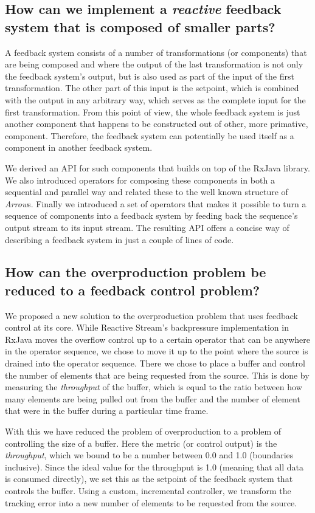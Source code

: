 \subsection*{How can we implement a \textit{reactive} feedback system that is composed of smaller parts?}
A feedback system consists of a number of transformations (or components) that are being composed and where the output of the last transformation is not only the feedback system's output, but is also used as part of the input of the first transformation. The other part of this input is the setpoint, which is combined with the output in any arbitrary way, which serves as the complete input for the first transformation. From this point of view, the whole feedback system is just another component that happens to be constructed out of other, more primative, component. Therefore, the feedback system can potentially be used itself as a component in another feedback system.

We derived an API for such components that builds on top of the RxJava library. We also introduced operators for composing these components in both a sequential and parallel way and related these to the well known structure of \textit{Arrow}s. Finally we introduced a set of operators that makes it possible to turn a sequence of components into a feedback system by feeding back the sequence's output stream to its input stream. The resulting API offers a concise way of describing a feedback system in just a couple of lines of code.

\subsection*{How can the overproduction problem be reduced to a feedback control problem?}
We proposed a new solution to the overproduction problem that uses feedback control at its core. While Reactive Stream's backpressure implementation in RxJava moves the overflow control up to a certain operator that can be anywhere in the operator sequence, we chose to move it up to the point where the source is drained into the operator sequence. There we chose to place a buffer and control the number of elements that are being requested from the source. This is done by measuring the \textit{throughput} of the buffer, which is equal to the ratio between how many elements are being pulled out from the buffer and the number of element that were in the buffer during a particular time frame.

With this we have reduced the problem of overproduction to a problem of controlling the size of a buffer. Here the metric (or control output) is the \textit{throughput}, which we bound to be a number between 0.0 and 1.0 (boundaries inclusive). Since the ideal value for the throughput is 1.0 (meaning that all data is consumed directly), we set this as the setpoint of the feedback system that controls the buffer. Using a custom, incremental controller, we transform the tracking error into a new number of elements to be requested from the source.
